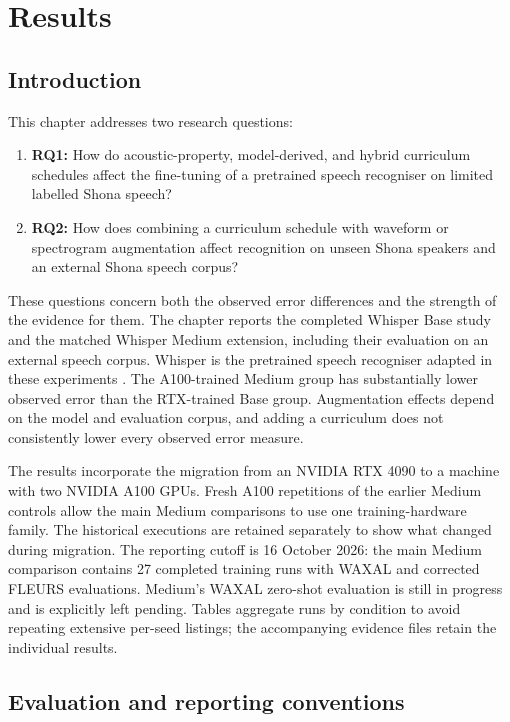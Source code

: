 \documentclass[12pt,a4paper]{report}
\begin{document}
\setcounter{chapter}{3}
\chapter{Results}
\label{chap:results}

\section{Introduction}

This chapter addresses two research questions:
\begin{enumerate}
\item \textbf{RQ1:} How do acoustic-property, model-derived, and hybrid curriculum
schedules affect the fine-tuning of a pretrained speech recogniser on limited
labelled Shona speech?
\item \textbf{RQ2:} How does combining a curriculum schedule with waveform or
spectrogram augmentation affect recognition on unseen Shona speakers and an
external Shona speech corpus?
\end{enumerate}
These questions concern both the observed error differences and the strength
of the evidence for them. The chapter reports the completed Whisper Base study
and the matched Whisper Medium extension, including their evaluation on an
external speech corpus. Whisper is the pretrained speech recogniser adapted
in these experiments \citep{Radford2023}. The A100-trained Medium group has
substantially lower observed error than the RTX-trained Base group. Augmentation
effects depend on the model and evaluation corpus, and adding a curriculum
does not consistently lower every observed error measure.

The results incorporate the migration from an NVIDIA RTX 4090 to a machine
with two NVIDIA A100 GPUs. Fresh A100 repetitions of the earlier Medium
controls allow the main Medium comparisons to use one training-hardware family.
The historical executions are retained separately to show what changed during
migration. The reporting cutoff is 16 October 2026: the main Medium comparison
contains 27 completed training runs with WAXAL and corrected FLEURS evaluations.
Medium's WAXAL zero-shot evaluation is still in progress and is explicitly
left pending. Tables aggregate runs by condition to avoid repeating extensive
per-seed listings; the accompanying evidence files retain the individual results.

\section{Evaluation and reporting conventions}
\end{document}
